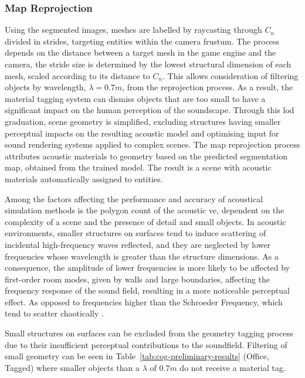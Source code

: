 \subsubsection{Map Reprojection}
Using the segmented images, meshes are labelled by raycasting through $C_n$ divided in strides, targeting entities within the camera frustum. The process depends on the distance between a target mesh in the game engine and the camera, the stride size is determined by the lowest structural dimension of each mesh, scaled according to its distance to $C_n$. This allows consideration of filtering objects by wavelength, $\lambda = 0.7m$, from the reprojection process. As a result, the material tagging system can dismiss objects that are too small to have a significant impact on the human perception of the soundscape. Through this \acrfull{lod} graduation, scene geometry is simplified, excluding structures having smaller perceptual impacts on the resulting acoustic model and optimising input for sound rendering systems applied to complex scenes. The map reprojection process attributes acoustic materials to geometry based on the predicted segmentation map, obtained from the trained model. The result is a scene with acoustic materials automatically assigned to entities.\par
Among the factors affecting the performance and accuracy of acoustical simulation methods is the polygon count of the acoustic \acrshort{ve}, dependent on the complexity of a scene and the presence of detail and small objects. In acoustic environments, smaller structures on surfaces tend to induce scattering of incidental high-frequency waves reflected, and they are neglected by lower frequencies whose wavelength is greater than the structure dimensions. As a consequence, the amplitude of lower frequencies is more likely to be affected by first-order room modes, given by walls and large boundaries, affecting the frequency response of the sound field, resulting in a more noticeable perceptual effect. As opposed to frequencies higher than the Schroeder Frequency, which tend to scatter chaotically \citep{kuttruff2016room, blauert1997spatial}.\par
Small structures on surfaces can be excluded from the geometry tagging process due to their insufficient perceptual contributions to the soundfield. Filtering of small geometry can be seen in Table~\ref{tab:cog-preliminary-results} (Office, Tagged) where smaller objects than a $\lambda$ of $0.7m$ do not receive a material tag.\par
